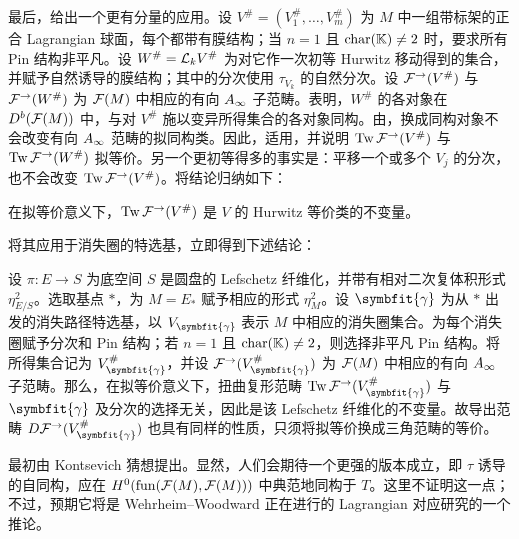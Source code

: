 最后，给出一个更有分量的应用。设 $V^\#=(V_1^\#,\ldots,V_m^\#)$ 为 $M$ 中一组带标架的正合 Lagrangian 球面，每个都带有膜结构；当 $n=1$ 且 $\operatorname{char}(\mathbb K)\ne2$ 时，要求所有 Pin 结构非平凡。设 $W^\#=\mathcal L_kV^\#$ 为对它作一次初等 Hurwitz 移动得到的集合，并赋予自然诱导的膜结构；其中的分次使用 $\tau_{V_k}$ 的自然分次。设 $\mathcal F^\to(V^\#)$ 与 $\mathcal F^\to(W^\#)$ 为 $\mathcal F(M)$ 中相应的有向 $A_\infty$ 子范畴。表明，$W^\#$ 的各对象在 $D^b(\mathcal F(M))$ 中，与对 $V^\#$ 施以变异所得集合的各对象同构。由，换成同构对象不会改变有向 $A_\infty$ 范畴的拟同构类。因此，适用，并说明 $\operatorname{Tw}\mathcal F^\to(V^\#)$ 与 $\operatorname{Tw}\mathcal F^\to(W^\#)$ 拟等价。另一个更初等得多的事实是：平移一个或多个 $V_j$ 的分次，也不会改变 $\operatorname{Tw}\mathcal F^\to(V^\#)$。将结论归纳如下：
\begin{theorem}\label{st:17.20}
在拟等价意义下，$\operatorname{Tw}\mathcal F^\to(V^\#)$ 是 $V$ 的 Hurwitz 等价类的不变量。
\end{theorem}
将其应用于消失圈的特选基，立即得到下述结论：
\begin{corollary}\label{st:17.21}
设 $\pi:E\to S$ 为底空间 $S$ 是圆盘的 Lefschetz 纤维化，并带有相对二次复体积形式 $\eta^2_{E/S}$。选取基点 $*$，为 $M=E_*$ 赋予相应的形式 $\eta_M^2$。设 $\symbfit{\gamma}$ 为从 $*$ 出发的消失路径特选基，以 $V_{\symbfit{\gamma}}$ 表示 $M$ 中相应的消失圈集合。为每个消失圈赋予分次和 Pin 结构；若 $n=1$ 且 $\operatorname{char}(\mathbb K)\ne2$，则选择非平凡 Pin 结构。将所得集合记为 $V_{\symbfit{\gamma}}^\#$，并设 $\F^\to(V_{\symbfit{\gamma}}^\#)$ 为 $\mathcal F(M)$ 中相应的有向 $A_\infty$ 子范畴。那么，在拟等价意义下，扭曲复形范畴 $\Tw\F^\to(V_{\symbfit{\gamma}}^\#)$ 与 $\symbfit{\gamma}$ 及分次的选择无关，因此是该 Lefschetz 纤维化的不变量。故导出范畴 $D\F^\to(V_{\symbfit{\gamma}}^\#)$ 也具有同样的性质，只须将拟等价换成三角范畴的等价。
\end{corollary}
\begin{note}\label{st:17.22}
最初由 Kontsevich 猜想提出。显然，人们会期待一个更强的版本成立，即 $\tau$ 诱导的自同构，应在 $H^0(\operatorname{fun}(\mathcal F(M),\mathcal F(M)))$ 中典范地同构于 $T$。这里不证明这一点；不过，预期它将是 Wehrheim–Woodward 正在进行的 Lagrangian 对应研究的一个推论。
\end{note}
